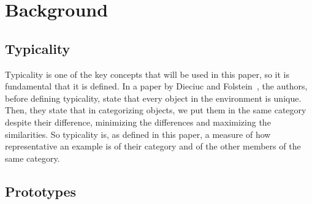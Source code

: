 \documentclass[conference]{IEEEtran}
\begin{document}
	\section{Background}
	
		\subsection{Typicality}
		
			\noindent Typicality is one of the key concepts that will be used in this paper, so it is fundamental that it is defined. In a paper by Dieciuc and Folstein~\cite{dieciuc2019typicality},
			the authors, before defining typicality, state that every object in the environment is unique. Then, they state that in categorizing objects, we put them in the same category 
			despite their difference, minimizing the differences and maximizing the similarities. So typicality is, as defined in this paper, a measure of how representative 
			an example is of their category and of the other members of the same category. 
		
		\subsection{Prototypes}
\end{document}
